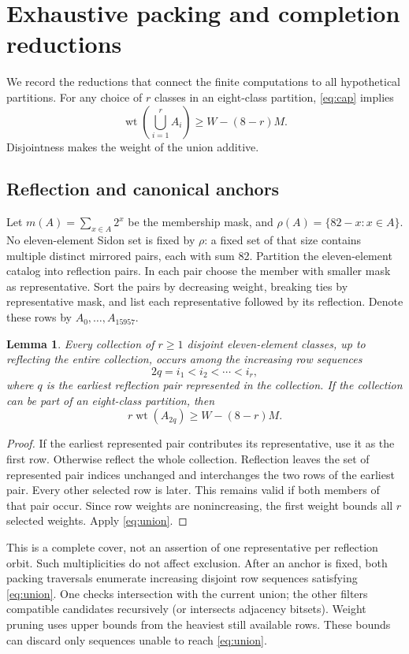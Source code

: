 \documentclass[11pt]{article}
\newtheorem{lemma}[theorem]{Lemma}
\newcommand{\wt}{\operatorname{wt}}
\begin{document}
\section{Exhaustive packing and completion reductions}
We record the reductions that connect the finite computations to all
hypothetical partitions. For any choice of $r$ classes in an eight-class
partition, \eqref{eq:cap} implies
\begin{equation}\label{eq:union}
 \wt\left(\bigcup_{i=1}^{r}A_i\right)\geq W-(8-r)M.
\end{equation}
Disjointness makes the weight of the union additive.

\subsection{Reflection and canonical anchors}\label{sec:reflection}
Let $m(A)=\sum_{x\in A}2^x$ be the membership mask, and
$\rho(A)=\{82-x:x\in A\}$. No eleven-element Sidon set is fixed by
$\rho$: a fixed set of that size contains multiple distinct mirrored
pairs, each with sum 82. Partition the eleven-element catalog into
reflection pairs. In each pair choose the member with smaller mask as
representative. Sort the pairs by decreasing weight, breaking ties by
representative mask, and list each representative followed by its
reflection. Denote these rows by $A_0,\ldots,A_{15957}$.

\begin{lemma}\label{lem:anchor}
Every collection of $r\geq1$ disjoint eleven-element classes, up to
reflecting the entire collection, occurs among the increasing row
sequences
\[
        2q=i_1<i_2<\cdots<i_r,
\]
where $q$ is the earliest reflection pair represented in the collection.
If the collection can be part of an eight-class partition, then
\[
                    r\wt(A_{2q})\geq W-(8-r)M.
\]
\end{lemma}
\begin{proof}
If the earliest represented pair contributes its representative, use it
as the first row. Otherwise reflect the whole collection. Reflection
leaves the set of represented pair indices unchanged and interchanges
the two rows of the earliest pair. Every other selected row is later.
This remains valid if both members of that pair occur. Since row weights
are nonincreasing, the first weight bounds all $r$ selected weights.
Apply \eqref{eq:union}.
\end{proof}

This is a complete cover, not an assertion of one representative per
reflection orbit. Such multiplicities do not affect exclusion. After an
anchor is fixed, both packing traversals enumerate increasing disjoint
row sequences satisfying \eqref{eq:union}. One checks intersection with
the current union; the other filters compatible candidates recursively
(or intersects adjacency bitsets). Weight pruning uses upper bounds
from the heaviest still available rows. These bounds can discard only
sequences unable to reach \eqref{eq:union}.
\end{document}
